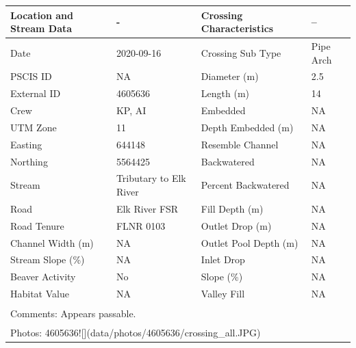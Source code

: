 \documentclass[
]{book}
\begin{document}
\begin{tabular}{llll}
\toprule
Location and Stream Data & - & Crossing Characteristics & --\\
\midrule
Date & 2020-09-16 & Crossing Sub Type & Pipe Arch\\
PSCIS ID & NA & Diameter (m) & 2.5\\
External ID & 4605636 & Length (m) & 14\\
Crew & KP, AI & Embedded & NA\\
UTM Zone & 11 & Depth Embedded (m) & NA\\
\addlinespace
Easting & 644148 & Resemble Channel & NA\\
Northing & 5564425 & Backwatered & NA\\
Stream & Tributary to Elk River & Percent Backwatered & NA\\
Road & Elk River FSR & Fill Depth (m) & NA\\
Road Tenure & FLNR 0103 & Outlet Drop (m) & NA\\
\addlinespace
Channel Width (m) & NA & Outlet Pool Depth (m) & NA\\
Stream Slope (\%) & NA & Inlet Drop & NA\\
Beaver Activity & No & Slope (\%) & NA\\
Habitat Value & NA & Valley Fill & NA\\
\bottomrule
\multicolumn{4}{l}{\textsuperscript{} Comments: Appears passable.}\\
\multicolumn{4}{l}{\textsuperscript{} Photos: 4605636![](data/photos/4605636/crossing\_all.JPG)}\\
\end{tabular}
\end{document}
